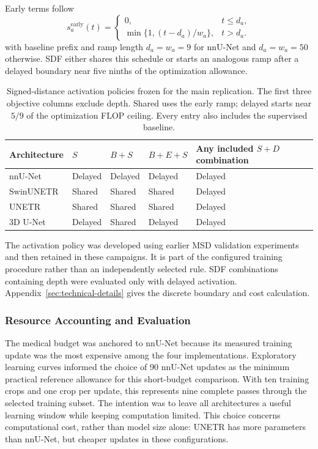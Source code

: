 \documentclass[12pt,a4paper]{article}
\begin{document}
Early terms follow
\begin{equation}
s_a^{\mathrm{early}}(t)=
\begin{cases}
0, & t\leq d_a,\\
\min\{1,(t-d_a)/w_a\}, & t>d_a.
\end{cases}
\label{eq:constraint-early-ramp}
\end{equation}
with baseline prefix and ramp length $d_a=w_a=9$ for nnU-Net and
$d_a=w_a=50$ otherwise. SDF either shares this schedule or starts an
analogous ramp after a delayed boundary near five ninths of the
optimization allowance.

\begin{table}[htbp]
\centering
\small
{}
\renewcommand{\arraystretch}{1.2}
\begin{tabular}{@{}P{3.0cm}P{2.0cm}P{2.2cm}P{2.7cm}P{3.8cm}@{}}
\hline
Architecture & $S$ & $B+S$ & $B+E+S$ & Any included $S+D$ combination \\
\hline
nnU-Net & Delayed & Delayed & Delayed & Delayed \\
SwinUNETR & Shared & Shared & Shared & Delayed \\
UNETR & Shared & Shared & Shared & Delayed \\
3D U-Net & Delayed & Shared & Delayed & Delayed \\
\hline
\end{tabular}
\caption{Signed-distance activation policies frozen for the main
replication. The first three objective columns exclude depth. Shared
uses the early ramp; delayed starts near $5/9$ of the optimization
FLOP ceiling. Every entry also includes the supervised baseline.}
\label{tab:sdf-activation-policies}
\end{table}

The activation policy was developed using earlier MSD validation
experiments and then retained in these campaigns. It is part of the
configured training procedure rather than an independently selected rule. SDF
combinations containing depth were evaluated only with delayed activation.
Appendix~\ref{sec:technical-details} gives the discrete boundary and
cost calculation.

\subsubsection{Resource Accounting and Evaluation}

The medical budget was anchored to nnU-Net because its measured training
update was the most expensive among the four implementations. Exploratory
learning curves informed the choice of 90 nnU-Net updates as the minimum
practical reference allowance for this short-budget comparison. With ten
training crops and one crop per update, this represents nine complete
passes through the selected training subset. The intention was to leave
all architectures a useful learning window while keeping computation
limited. This choice concerns computational cost, rather than model size
alone: UNETR has more parameters than nnU-Net, but cheaper updates in
these configurations.
\end{document}
